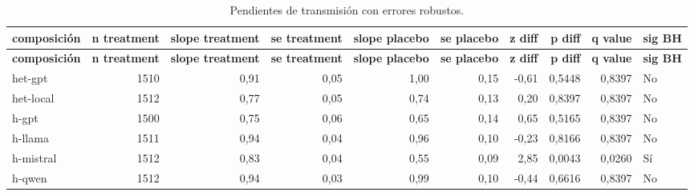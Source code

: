 \begin{landscape}
\scriptsize
\begin{longtable}{lrrrrrrrrl}
\caption{Pendientes de transmisión con errores robustos.}\label{tab:t07}\\
\hline
\textbf{composición} & \textbf{n treatment} & \textbf{slope treatment} & \textbf{se treatment} & \textbf{slope placebo} & \textbf{se placebo} & \textbf{z diff} & \textbf{p diff} & \textbf{q value} & \textbf{sig BH} \\
\hline
\endfirsthead
\hline
\textbf{composición} & \textbf{n treatment} & \textbf{slope treatment} & \textbf{se treatment} & \textbf{slope placebo} & \textbf{se placebo} & \textbf{z diff} & \textbf{p diff} & \textbf{q value} & \textbf{sig BH} \\
\hline
\endhead
\hline
\endfoot
het-gpt & 1510 & 0,91 & 0,05 & 1,00 & 0,15 & -0,61 & 0,5448 & 0,8397 & No \\
het-local & 1512 & 0,77 & 0,05 & 0,74 & 0,13 & 0,20 & 0,8397 & 0,8397 & No \\
h-gpt & 1500 & 0,75 & 0,06 & 0,65 & 0,14 & 0,65 & 0,5165 & 0,8397 & No \\
h-llama & 1511 & 0,94 & 0,04 & 0,96 & 0,10 & -0,23 & 0,8166 & 0,8397 & No \\
h-mistral & 1512 & 0,83 & 0,04 & 0,55 & 0,09 & 2,85 & 0,0043 & 0,0260 & Sí \\
h-qwen & 1512 & 0,94 & 0,03 & 0,99 & 0,10 & -0,44 & 0,6616 & 0,8397 & No \\
\end{longtable}
\end{landscape}
